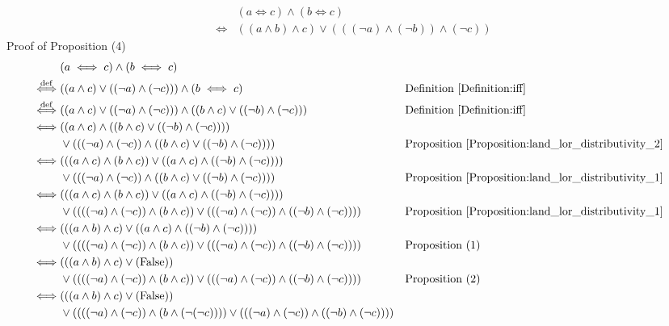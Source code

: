 \begin{prop}
\begin{align*}
& (a \iff c) \land (b \iff c) \\
\iff & ((a \land b) \land c) \lor (((\lnot a) \land (\lnot b)) \land (\lnot c))
\end{align*}
Proof of Proposition (4)
\begin{align*}
& (a \iff c) \land (b \iff c) \\
\overset{\operatorname{def}}{\iff} & ((a \land c) \lor ((\lnot a) \land (\lnot c))) \land (b \iff c)
& & \text{Definition \ref{Definition:iff}} \\
\overset{\operatorname{def}}{\iff} & ((a \land c) \lor ((\lnot a) \land (\lnot c))) \land ((b \land c) \lor ((\lnot b) \land (\lnot c)))
& & \text{Definition \ref{Definition:iff}} \\
\iff & ((a \land c) \land ((b \land c) \lor ((\lnot b) \land (\lnot c)))) \\
& \lor (((\lnot a) \land (\lnot c)) \land ((b \land c) \lor ((\lnot b) \land (\lnot c))))
& & \text{Proposition \ref{Proposition:land_lor_distributivity_2}} \\
\iff & (((a \land c) \land (b \land c)) \lor ((a \land c) \land ((\lnot b) \land (\lnot c)))) \\
& \lor (((\lnot a) \land (\lnot c)) \land ((b \land c) \lor ((\lnot b) \land (\lnot c))))
& & \text{Proposition \ref{Proposition:land_lor_distributivity_1}} \\
\iff & (((a \land c) \land (b \land c)) \lor ((a \land c) \land ((\lnot b) \land (\lnot c)))) \\
& \lor ((((\lnot a) \land (\lnot c)) \land (b \land c)) \lor (((\lnot a) \land (\lnot c)) \land ((\lnot b) \land (\lnot c))))
& & \text{Proposition \ref{Proposition:land_lor_distributivity_1}} \\
\iff & (((a \land b) \land c) \lor ((a \land c) \land ((\lnot b) \land (\lnot c)))) \\
& \lor ((((\lnot a) \land (\lnot c)) \land (b \land c)) \lor (((\lnot a) \land (\lnot c)) \land ((\lnot b) \land (\lnot c))))
& & \text{Proposition (1)} \\
\iff & (((a \land b) \land c) \lor (\text{False})) \\
& \lor ((((\lnot a) \land (\lnot c)) \land (b \land c)) \lor (((\lnot a) \land (\lnot c)) \land ((\lnot b) \land (\lnot c))))
& & \text{Proposition (2)} \\
\iff & (((a \land b) \land c) \lor (\text{False})) \\
& \lor ((((\lnot a) \land (\lnot c)) \land (b \land (\lnot (\lnot c)))) \lor (((\lnot a) \land (\lnot c)) \land ((\lnot b) \land (\lnot c))))

\end{align*}
\end{prop}
